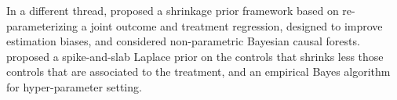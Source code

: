 \documentclass[12pt]{article}
\def\cred{\textcolor{red}}
\begin{document}
In a different thread, \cite{Hahn18} proposed a shrinkage prior framework based on re-parameterizing a joint outcome and treatment regression, designed to improve estimation biases,
and \cite{Hahn20} considered non-parametric Bayesian causal forests.
\cite{Antonelli19} proposed a spike-and-slab Laplace prior on the controls that shrinks less those controls that are associated to the treatment, %
and an empirical Bayes algorithm for hyper-parameter setting. %
\end{document}
